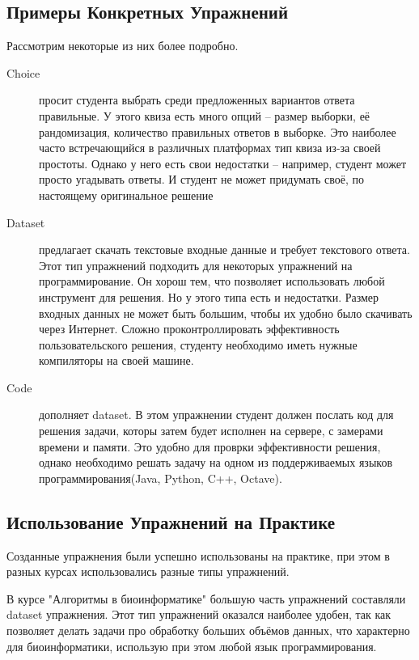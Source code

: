 \documentclass{matmex-diploma-custom}
\begin{document}
\subsection*{Примеры Конкретных Упражнений}
Рассмотрим некоторые из них более подробно.
\begin{description}
\item[Choice] просит студента выбрать среди предложенных вариантов
ответа правильные. У этого квиза есть много опций -- размер выборки,
её рандомизация, количество правильных ответов в выборке. Это наиболее
часто встречающийся в различных платформах тип квиза из-за своей
простоты. Однако у него есть свои недостатки -- например, студент
может просто угадывать ответы. И студент не может придумать своё, по
настоящему оригинальное решение

\item[Dataset] предлагает скачать текстовые входные данные и требует
текстового ответа. Этот тип упражнений подходить для некоторых
упражнений на программирование. Он хорош тем, что позволяет
использовать любой инструмент для решения. Но у этого типа есть и
недостатки. Размер входных данных не может быть большим, чтобы их
удобно было скачивать через Интернет. Сложно проконтроллировать
эффективность пользовательского решения, студенту необходимо иметь
нужные компиляторы на своей машине.

\item[Code] дополняет dataset. В этом упражнении студент должен
послать код для решения задачи, которы затем будет исполнен на
сервере, с замерами времени и памяти. Это удобно для проврки
эффективности решения, однако необходимо решать задачу на одном из
поддерживаемых языков программирования(Java, Python, C++, Octave).
\end{description}

\subsection*{Использование Упражнений на Практике}

Созданные упражнения были успешно использованы на практике, при этом в
разных курсах использовались разные типы упражнений.

В курсе "Алгоритмы в биоинформатике" большую часть упражнений
составляли dataset упражнения. Этот тип упражнений оказался наиболее
удобен, так как позволяет делать задачи про обработку больших объёмов
данных, что характерно для биоинформатики, использую при этом любой
язык программирования.
\end{document}
